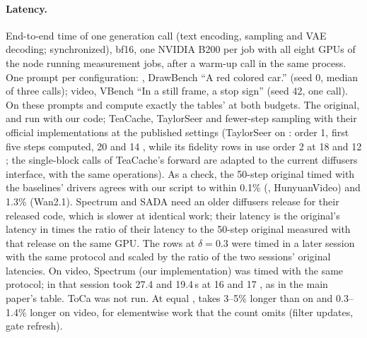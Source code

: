 \paragraph{Latency.} End-to-end time of one generation call (text encoding, sampling and VAE decoding; synchronized),
bf16, one NVIDIA B200 per job with all eight GPUs of the node running measurement jobs, after a warm-up call in the same
process. One prompt per configuration: \flux, DrawBench ``A red colored car.'' (seed 0, median of three calls); video,
VBench ``In a still frame, a stop sign'' (seed 42, one call). On these prompts \seacache and \ours compute exactly the
tables' \nfe at both budgets. The original, \seacache and \ours run with our code; TeaCache, TaylorSeer and fewer-step
sampling with their official implementations at the published settings (TaylorSeer on \flux: order 1, first five steps
computed, 20 and 14 \nfe, while its fidelity rows in  use order 2 at 18 and 12 \nfe; the single-block calls of TeaCache's \flux forward are adapted to the current diffusers interface, with the
same operations). As a check, the 50-step original timed with the baselines' drivers agrees with our script to within
0.1\% (\flux, HunyuanVideo) and 1.3\% (Wan2.1). Spectrum and SADA need an older diffusers release for their
released \flux code, which is slower at identical work; their latency is the original's latency in
 times the ratio of their latency to the 50-step original measured with that release on the same
GPU. The \flux rows at $\delta=0.3$ were timed in a later session with the same protocol and scaled by the ratio of the
two sessions' original latencies. On video, Spectrum (our implementation) was timed with the same protocol; in that session \ours took 27.4 and 19.4\,s at 16 and 17 \nfe, as in the main paper's table. ToCa was not run. At equal \nfe, \ours takes 3--5\%
longer than \seacache on \flux and 0.3--1.4\% longer on video, for elementwise work that the count omits (filter updates, gate refresh).
